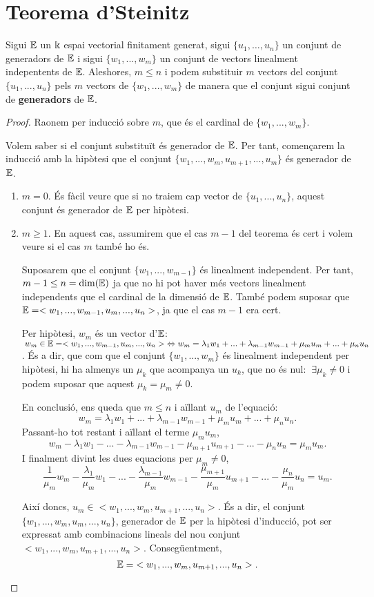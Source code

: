 \section{Teorema d'Steinitz}
Sigui $\mathbb{E}$ un $\Bbbk$ espai vectorial finitament generat, sigui $\{u_1,\dots, u_n\}$ un conjunt de generadors de $\mathbb{E}$ i sigui $\{w_1,..., w_m\}$ un conjunt de vectors linealment indepentents de $\mathbb{E}$. Aleshores, $m \leq n$ i podem substituir $m$ vectors del conjunt $\{u_1, ..., u_n\}$ pels $m$ vectors de $\{w_1,..., w_m\}$ de manera que el conjunt sigui conjunt de \textbf{generadors} de $\mathbb{E}$.
\\

\begin{proof}
Raonem per inducció sobre $m$, que és el cardinal de $\{w_1,..., w_m\}$.

Volem saber si el conjunt substituït és generador de $\mathbb{E}$. Per tant, començarem la inducció amb la hipòtesi que el conjunt $\{w_1,..., w_m, u_{m+1}, ..., u_m\}$ és generador de $\mathbb{E}$.
\begin{enumerate}[(1)]
\item $m = 0$.
És fàcil veure que si no traiem cap vector de $\{u_1,..., u_n\}$, aquest conjunt és generador de $\mathbb{E}$ per hipòtesi.

\item $m \geq 1$. 
En aquest cas, assumirem que el cas $m-1$ del teorema és cert i volem veure si el cas $m$ també ho és.

Suposarem que el conjunt $\{w_1,..., w_{m-1}\}$ és linealment independent. Per tant, $m-1 \leq n = \dim(\mathbb{E})$ ja que no hi pot haver més vectors linealment independents que el cardinal de la dimensió de $\mathbb{E}$. També podem suposar que $\mathbb{E} = <w_1,...,w_{m-1},u_m,...,u_n>$, ja que el cas $m-1$ era cert.

Per hipòtesi, $w_m$ és un vector d'$\mathbb{E}$: $\:w_m \in \mathbb{E} = <w_1,...,w_{m-1},u_m,...,u_n> \;\Leftrightarrow  w_m = \lambda_1 w_1 + ... + \lambda_{m-1}w_{m-1} + \mu_mu_m + ... + \mu_nu_n$. És a dir, que com que el conjunt $\{w_1,..., w_m\}$ és linealment independent per hipòtesi, hi ha almenys un $\mu_k$ que acompanya un $u_k$, que no és nul: $\:\exists\mu_k \neq 0$ i podem suposar que aquest $\mu_k = \mu_m \neq 0$.

En conclusió, ens queda que $m \leq n$ i aïllant $u_m$ de l'equació:
\[
w_m = \lambda_1w_1 + ... + \lambda_{m-1}w_{m-1} + \mu_mu_m + ... + \mu_nu_n.
\]
Passant-ho tot restant i aïllant el terme $\mu_mu_m$,
\[
w_m - \lambda_1w_1 - ... - \lambda_{m-1}w_{m-1} - \mu_{m+1}u_{m+1} - ... - \mu_nu_n = \mu_mu_m.
\]
I finalment divint les dues equacions per $\mu_m \neq 0$,
\[
\frac{1}{\mu_m}w_m - \frac{\lambda_1}{\mu_m}w_1 - ... - \frac{\lambda_{m-1}}{\mu_m}w_{m-1} - \frac{\mu_{m+1}}{\mu_m}u_{m+1} - ... - \frac{\mu_n}{\mu_m}u_n = u_m.
\]

Així doncs, $u_m \in <w_1,...,w_m,u_{m+1},...,u_n>$. És a dir, el conjunt $\{w_1,...,w_m,u_{m},...,u_n\}$, generador de $\mathbb{E}$ per la hipòtesi d'inducció, pot ser expressat amb combinacions lineals del nou conjunt $<w_1,...,w_m,u_{m+1},...,u_n>$. Consegüentment, 
\[
\mathbb{E} = \;<w_1,...,w_m,u_{m+1},...,u_n>.
\]
\end{enumerate}
\end{proof}


